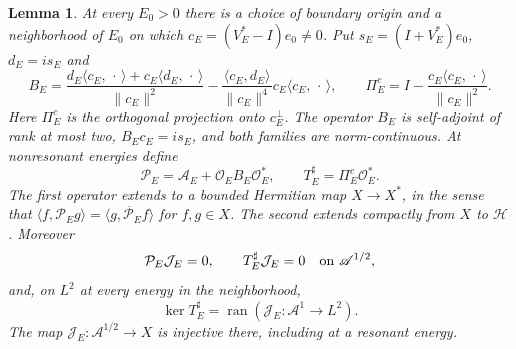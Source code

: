 \documentclass[11pt]{amsart}
\numberwithin{equation}{section}
\newtheorem{lemma}{Lemma}[section]
\newcommand{\HH}{\mathscr H}
\newcommand{\OO}{\mathcal O}
\newcommand{\Aop}{\mathcal A}
\newcommand{\PP}{\mathcal P}
\newcommand{\JJ}{\mathcal J}
\newcommand{\ran}{\operatorname{ran}}
\newcommand{\ip}[2]{\langle #1,#2\rangle}
\newcommand{\norm}[1]{\lVert #1\rVert}
\begin{document}
\begin{lemma}\label{lem:cut}
At every $E_0>0$ there is a choice of boundary origin and a neighborhood
of $E_0$ on which
$c_E=(V_E^*-I)e_0\ne0$. Put $s_E=(I+V_E^*)e_0$, $d_E=is_E$ and
\begin{equation}\label{eq:Bcut}
 B_E=\frac{d_E\ip{c_E}{\,\cdot\,}+c_E\ip{d_E}{\,\cdot\,}}{\norm{c_E}^2}
       -\frac{\ip{c_E}{d_E}}{\norm{c_E}^4}
                   c_E\ip{c_E}{\,\cdot\,},
 \qquad \Pi_E^c=I-\frac{c_E\ip{c_E}{\,\cdot\,}}{\norm{c_E}^2}.
\end{equation}
Here $\Pi_E^c$ is the orthogonal projection onto $c_E^\perp$.
The operator $B_E$ is self-adjoint of rank at most two,
$B_Ec_E=is_E$, and both families are norm-continuous. At nonresonant energies define
\begin{equation}\label{eq:periodic-operators}
 \PP_E=\Aop_E+\OO_E B_E\OO_E^*,\qquad
 T_E^\sharp=\Pi_E^c\OO_E^*.
\end{equation}
The first operator extends to a bounded Hermitian map $X\to X^*$,
in the sense that
$\ip f{\PP_Eg}=\overline{\ip g{\PP_Ef}}$ for $f,g\in X$.
The second extends compactly from $X$ to $\HH$. Moreover
\begin{equation}\label{eq:periodic-null}
 \PP_E\JJ_E=0,\qquad T_E^\sharp\JJ_E=0
       \quad\hbox{on }\mathscr A^{1/2},
\end{equation}
and, on $L^2$ at every energy in the neighborhood,
\begin{equation}\label{eq:projected-kernel}
 \ker T_E^\sharp=\ran(\JJ_E:\mathscr A^1\to L^2).
\end{equation}
The map $\JJ_E:\mathscr A^{1/2}\to X$ is injective there, including at a
resonant energy.
\end{lemma}
\end{document}

